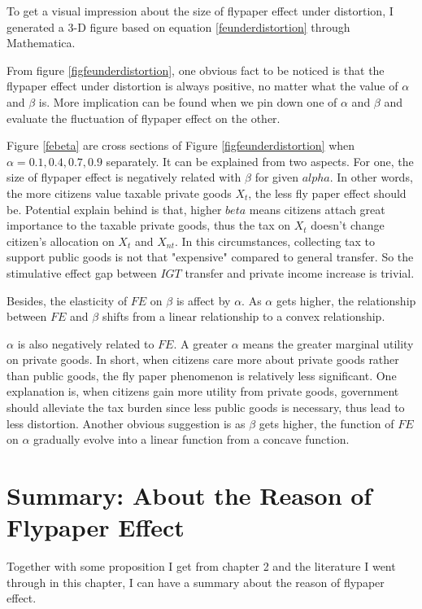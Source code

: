 To get a visual impression about the size of flypaper effect under distortion, I generated a 3-D figure based on equation \ref*{feunderdistortion} through Mathematica.


From figure \ref*{figfeunderdistortion}, one obvious fact to be noticed is that the flypaper effect under distortion is always positive, no matter what the value of $\alpha$ and $\beta$ is. More implication can be found when we pin down one of $\alpha$ and $\beta$ and evaluate the fluctuation of flypaper effect on the other.

Figure \ref*{febeta} are cross sections of Figure \ref*{figfeunderdistortion} when $\alpha=0.1,0.4,0.7,0.9$ separately. It can be explained from two aspects. For one, the size of flypaper effect is negatively related with $\beta$ for given $alpha$. In other words, the more citizens value taxable private goods $X_t$, the less fly paper effect should be. Potential explain behind is that, higher $beta$ means citizens attach great importance to the taxable private goods, thus the tax on $X_t$ doesn't change citizen's allocation on $X_t$ and $X_{nt}$. In this circumstances, collecting tax to support public goods is not that "expensive" compared to general transfer. So the stimulative effect gap between $IGT$ transfer and private income increase is trivial.

Besides, the elasticity of $FE$ on $\beta$ is affect by $\alpha$. As $\alpha$ gets higher, the relationship between $FE$ and $\beta$ shifts from a linear relationship to a convex relationship.

$\alpha$ is also negatively related to $FE$. A greater $\alpha$ means the greater marginal utility on private goods. In short, when citizens care more about private goods rather than public goods, the fly paper phenomenon is relatively less significant. One explanation is, when citizens gain more utility from private goods, government should alleviate the tax burden since less public goods is necessary, thus lead to less distortion. Another obvious suggestion is as $\beta$ gets higher, the function of $FE$ on $\alpha$ gradually evolve into a linear function from a concave function.


\section{Summary: About the Reason of Flypaper Effect}
Together with some proposition I get from chapter 2 and the literature I went through in this chapter, I can have a summary about the reason of flypaper effect.

